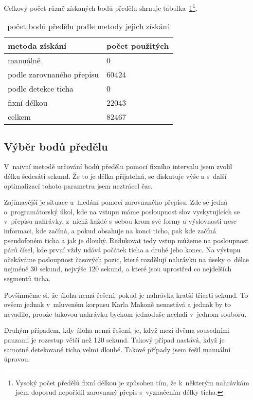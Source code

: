 Celkový počet různě získaných bodů předělu shrnuje
tabulka~\ref{tab:splitpoints}\footnote{Vysoký počet předělů fixní délkou je způsoben tím, že
k~některým nahrávkám jsem doposud nepořídil zarovnaný přepis s~vyznačením délky
ticha.}.

\begin{table}[htpb]
\begin{center}
\begin{tabular}{|l|l|}
\hline
metoda získání & počet použitých \\
\hline
manuálně & 0 \\
podle zarovnaného přepisu & 60424 \\
podle detekce ticha & 0 \\
fixní délkou & 22043 \\
celkem & 82467 \\
\hline
\end{tabular}
\caption{počet bodů předělu podle metody jejich získání}\label{tab:splitpoints}
\end{center}
\end{table}

\subsection{Výběr bodů předělu}

V~naivní metodě určování bodů předělu pomocí fixního intervalu jsem zvolil délku
šedesáti sekund. Že to je délka přijatelná, se diskutuje výše a s~další
optimalizací tohoto parametru jsem neztrácel čas.

Zajímavější je situace u~hledání pomocí zarovnaného přepisu. Zde se jedná
o~programátorský úkol, kde na vstupu máme posloupnost slov vyskytujících se
v~přepisu nahrávky, z~nichž každé s~sebou krom své formy a výslovnosti nese
informaci, kde začíná, a pokud obsahuje na konci ticho, pak kde začíná
pseudofoném ticha a jak je dlouhý.  Redukovat tedy vstup můžeme na posloupnost
párů čísel, kde první vždy udává počátek ticha a druhé jeho konec. Na výstupu
očekáváme posloupnost časových pozic, které rozdělují nahrávku na úseky o~délce
nejméně 30 sekund, nejvýše 120 sekund, a které jsou uprostřed co nejdelších
segmentů ticha.

Povšimněme si, že úloha nemá řešení, pokud je nahrávka kratší třiceti sekund. To
ovšem jednak v~mluveném korpusu Karla Makoně nenastává a jednak by to nevadilo,
proože takovou nahrávku bychom jednoduše nechali v~jednom souboru.

Druhým případem, kdy úloha nemá řešení, je, když mezi dvěma sousedními pauzami
je rozestup větší než 120 sekund. Takový případ nastává, když je samotné
detekované ticho velmi dlouhé. Takové případy jsem řešil manuální úpravou.

